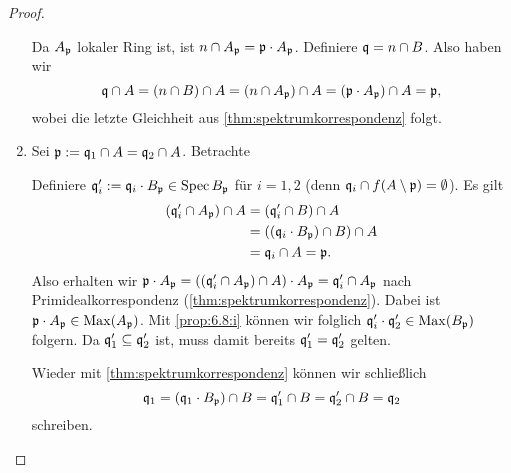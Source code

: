 \documentclass[12pt,a4paper]{scrartcl}
\theoremstyle{cplain}
\theoremstyle{cdef}
\begin{document}
\begin{proof}
\begin{enumerate}[label=\ref{prop:6.8:\roman*}]
		Da $A_{\mathfrak{p}}$ lokaler Ring ist, ist $n\cap A_{\mathfrak{p}} = \mathfrak{p}\cdot A_{\mathfrak{p}}$. Definiere $\mathfrak{q} = n\cap B$. Also haben wir 
		\[\mathfrak{q}\cap A = (n\cap B)\cap A = (n\cap A_{\mathfrak{p}})\cap A = (\mathfrak{p}\cdot A_{\mathfrak{p}})\cap A = \mathfrak{p},\]
		wobei die letzte Gleichheit aus \cref{thm:spektrumkorrespondenz} folgt.
		\item Sei $\mathfrak{p} := \mathfrak{q}_1\cap A = \mathfrak{q}_2\cap A$. Betrachte
		\begin{center}
		\end{center}
		Definiere $\mathfrak{q}_i' := \mathfrak{q}_i\cdot B_{\mathfrak{p}}\in \operatorname{Spec} B_{\mathfrak{p}}$ für $i = 1,2$ (denn $\mathfrak{q}_i\cap f(A\setminus \mathfrak{p}) = \emptyset$). Es gilt \begin{align*}(\mathfrak{q}_i'\cap A_{\mathfrak{p}})\cap A &= (\mathfrak{q}_i'\cap B) \cap A \\
									   &= ((\mathfrak{q}_i\cdot B_{\mathfrak{p}})\cap B)\cap A\\
									   &= \mathfrak{q}_i \cap A = \mathfrak{p}.
		\end{align*}
		Also erhalten wir $\mathfrak{p}\cdot A_{\mathfrak{p}} = ((\mathfrak{q}_i'\cap A_{\mathfrak{p}})\cap A)\cdot A_{\mathfrak{p}} = \mathfrak{q}_i'\cap A_{\mathfrak{p}}$ nach Primidealkorrespondenz (\cref{thm:spektrumkorrespondenz}).
		Dabei ist $\mathfrak{p}\cdot A_{\mathfrak{p}}\in \operatorname{Max}(A_{\mathfrak{p}})$. Mit \ref{prop:6.8:i} können wir folglich $\mathfrak{q}_i'\cdot \mathfrak{q}_2'\in \operatorname{Max}(B_{\mathfrak{p}})$ folgern. Da $\mathfrak{q}_1'\subseteq \mathfrak{q}_2'$ ist, muss damit bereits $\mathfrak{q}_1' = \mathfrak{q}_2'$ gelten.
		
		Wieder mit \cref{thm:spektrumkorrespondenz} können wir schließlich
		\[\mathfrak{q}_1 = (\mathfrak{q}_1\cdot B_{\mathfrak{p}})\cap B = \mathfrak{q}_1'\cap B = \mathfrak{q}_2'\cap B = \mathfrak{q}_2\]
		schreiben.
		\qedhere
	\end{enumerate}
\end{proof}
\end{document}

